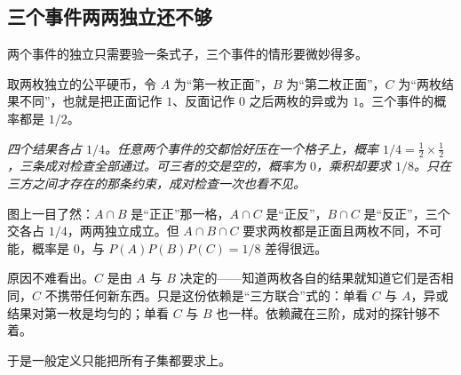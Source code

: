 \subsection{三个事件两两独立还不够}

两个事件的独立只需要验一条式子，三个事件的情形要微妙得多。

取两枚独立的公平硬币，令 \(A\) 为``第一枚正面''，\(B\) 为``第二枚正面''，\(C\) 为``两枚结果不同''，也就是把正面记作 \(1\)、反面记作 \(0\) 之后两枚的异或为 \(1\)。三个事件的概率都是 \(1/2\)。

\begin{center}

\emph{四个结果各占 \(1/4\)。任意两个事件的交都恰好压在一个格子上，概率 \(1/4=\tfrac12\times\tfrac12\)，三条成对检查全部通过。可三者的交是空的，概率为 \(0\)，乘积却要求 \(1/8\)。只在三方之间才存在的那条约束，成对检查一次也看不见。}
\end{center}

图上一目了然：\(A\cap B\) 是``正正''那一格，\(A\cap C\) 是``正反''，\(B\cap C\) 是``反正''，三个交各占 \(1/4\)，两两独立成立。但 \(A\cap B\cap C\) 要求两枚都是正面且两枚不同，不可能，概率是 \(0\)，与 \(P(A)P(B)P(C)=1/8\) 差得很远。

原因不难看出。\(C\) 是由 \(A\) 与 \(B\) 决定的——知道两枚各自的结果就知道它们是否相同，\(C\) 不携带任何新东西。只是这份依赖是``三方联合''式的：单看 \(C\) 与 \(A\)，异或结果对第一枚是均匀的；单看 \(C\) 与 \(B\) 也一样。依赖藏在三阶，成对的探针够不着。

于是一般定义只能把所有子集都要求上。

